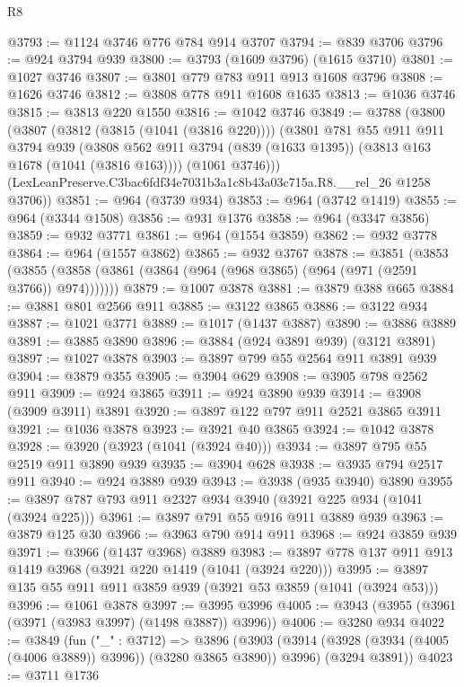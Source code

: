 \begin{lexlean}{R8}
\begin{coremodule}
@3793 := @1124 @3746 @776 @784 @914 @3707
@3794 := @839 @3706
@3796 := @924 @3794 @939
@3800 := @3793 (@1609 @3796) (@1615 @3710)
@3801 := @1027 @3746
@3807 := @3801 @779 @783 @911 @913 @1608 @3796
@3808 := @1626 @3746
@3812 := @3808 @778 @911 @1608 @1635
@3813 := @1036 @3746
@3815 := @3813 @220 @1550
@3816 := @1042 @3746
@3849 := @3788
    (@3800
      (@3807
        (@3812 (@3815 (@1041 (@3816 @220))))
        (@3801
          @781
          @55
          @911
          @911
          @3794
          @939
          (@3808 @562 @911 @3794 (@839 (@1633 @1395)) (@3813 @163 @1678 (@1041 (@3816 @163))))
          (@1061 @3746)))
      (LexLeanPreserve.C3bac6fdf34e7031b3a1c8b43a03c715a.R8.__rel_26 @1258 @3706))
@3851 := @964 (@3739 @934)
@3853 := @964 (@3742 @1419)
@3855 := @964 (@3344 @1508)
@3856 := @931 @1376
@3858 := @964 (@3347 @3856)
@3859 := @932 @3771
@3861 := @964 (@1554 @3859)
@3862 := @932 @3778
@3864 := @964 (@1557 @3862)
@3865 := @932 @3767
@3878 := @3851
    (@3853 (@3855 (@3858 (@3861 (@3864 (@964 (@968 @3865) (@964 (@971 (@2591 @3766)) @974)))))))
@3879 := @1007 @3878
@3881 := @3879 @388 @665
@3884 := @3881 @801 @2566 @911
@3885 := @3122 @3865
@3886 := @3122 @934
@3887 := @1021 @3771
@3889 := @1017 (@1437 @3887)
@3890 := @3886 @3889
@3891 := @3885 @3890
@3896 := @3884 (@924 @3891 @939) (@3121 @3891)
@3897 := @1027 @3878
@3903 := @3897 @799 @55 @2564 @911 @3891 @939
@3904 := @3879 @355
@3905 := @3904 @629
@3908 := @3905 @798 @2562 @911
@3909 := @924 @3865
@3911 := @924 @3890 @939
@3914 := @3908 (@3909 @3911) @3891
@3920 := @3897 @122 @797 @911 @2521 @3865 @3911
@3921 := @1036 @3878
@3923 := @3921 @40 @3865
@3924 := @1042 @3878
@3928 := @3920 (@3923 (@1041 (@3924 @40)))
@3934 := @3897 @795 @55 @2519 @911 @3890 @939
@3935 := @3904 @628
@3938 := @3935 @794 @2517 @911
@3940 := @924 @3889 @939
@3943 := @3938 (@935 @3940) @3890
@3955 := @3897 @787 @793 @911 @2327 @934 @3940 (@3921 @225 @934 (@1041 (@3924 @225)))
@3961 := @3897 @791 @55 @916 @911 @3889 @939
@3963 := @3879 @125 @30
@3966 := @3963 @790 @914 @911
@3968 := @924 @3859 @939
@3971 := @3966 (@1437 @3968) @3889
@3983 := @3897 @778 @137 @911 @913 @1419 @3968 (@3921 @220 @1419 (@1041 (@3924 @220)))
@3995 := @3897 @135 @55 @911 @911 @3859 @939 (@3921 @53 @3859 (@1041 (@3924 @53)))
@3996 := @1061 @3878
@3997 := @3995 @3996
@4005 := @3943 (@3955 (@3961 (@3971 (@3983 @3997) (@1498 @3887)) @3996))
@4006 := @3280 @934
@4022 := @3849
    (fun ("_" : @3712) =>
    @3896
      (@3903 (@3914 (@3928 (@3934 (@4005 (@4006 @3889)) @3996)) (@3280 @3865 @3890)) @3996)
      (@3294 @3891))
@4023 := @3711 @1736

\end{coremodule}
\end{lexlean}
